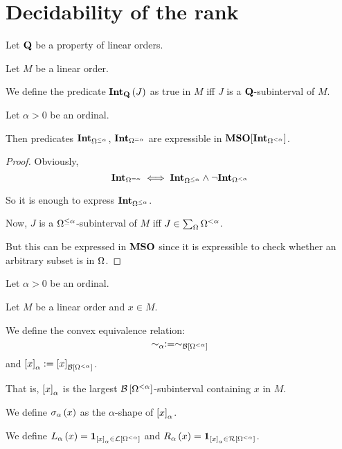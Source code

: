 \section{Decidability of the rank}

\begin{definition}
  Let $\mathbf{Q}$ be a property of linear orders.

  Let $M$ be a linear order.

  We define the predicate $\mathbf{Int}_{\mathbf{Q}} \left( {J} \right)$ as
  true in $M$ iff $J$ is a $\mathbf{Q}$-subinterval of $M$.
\end{definition}

\begin{lemma}
  Let $\alpha > 0$ be an ordinal.

  Then predicates $\mathbf{Int}_{\Omega^{\le \alpha}}$, $\mathbf{Int}_{\Omega^{= \alpha}}$
  are expressible in $\mathbf{MSO}[\mathbf{Int}_{\Omega^{< \alpha}}]$.
\end{lemma}

\begin{proof}
  Obviously, \[
    \mathbf{Int}_{\Omega^{= \alpha}}
    \iff \mathbf{Int}_{\Omega^{\le \alpha}} \wedge \neg \mathbf{Int}_{\Omega^{< \alpha}}
  \]

  So it is enough to express $\mathbf{Int}_{\Omega^{\le \alpha}}$.

  Now, $J$ is a $\Omega^{\le \alpha}$-subinterval of $M$ iff
  $J \in \sum_{\Omega}{\Omega^{< \alpha}}$.

  But this can be expressed in $\mathbf{MSO}$ since it is expressible
  to check whether an arbitrary subset is in $\Omega$.
\end{proof}

\begin{definition}
  Let $\alpha > 0$ be an ordinal.

  Let $M$ be a linear order and $x \in M$.

  We define the convex equivalence relation:
  \[\sim_\alpha := \sim_{\mathcal{B} \left[ {{\Omega^{< \alpha}}} \right]}\]
  and $\left[ {x} \right]_{\alpha} := \left[ {x} \right]_{\mathcal{B} \left[ {{\Omega^{< \alpha}}} \right]}$.

  That is,
  $\left[ {x} \right]_{\alpha}$ is the largest $\mathcal{B} \left[ {{\Omega^{< \alpha}}} \right]$-subinterval
  containing $x$ in $M$.

  We define $\sigma_{\alpha} \left( {x} \right)$ as
  the $\alpha$-shape of $\left[ {x} \right]_{\alpha}$.

  We define
  $L_{\alpha} \left( {x} \right) = \mathbf{1}_{\left[ {x} \right]_{\alpha} \in \mathcal{L} \left[ {{\Omega^{< \alpha}}} \right]}$ and
  $R_{\alpha} \left( {x} \right) = \mathbf{1}_{\left[ {x} \right]_{\alpha} \in \mathcal{R} \left[ {{\Omega^{< \alpha}}} \right]}$.
\end{definition}

